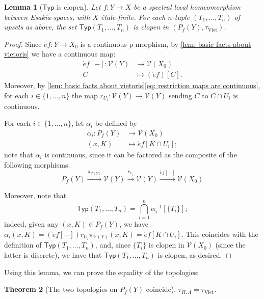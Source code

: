 \documentclass[12pt]{amsart}
\theoremstyle{plain}
\newtheorem{theorem}{Theorem}[section]
\newtheorem{lemma}[theorem]{Lemma}
\theoremstyle{definition}
\newcommand{\V}{\mathcal{V}}
\newcommand{\Viet}{\mathrm{Viet}}
\newcommand{\Typ}{\mathsf{Typ}}
\begin{document}
\begin{lemma}[$\Typ$ is clopen]\label{lem: clopenness of the type sets}
     Let $f \colon Y \to X$ be a spectral local homeomorphism between Esakia spaces, with $X$ étale-finite.
     For each $n$-tuple $(T_{1},\dots,T_{n})$ of upsets as above, the set $\Typ(T_{1},\dots,T_{n})$ is clopen in $(P_{f}(Y),\tau_{\Viet})$.
\end{lemma}
\begin{proof}    
    Since $\acute{e} f \colon Y\to X_{0}$ is a continuous p-morphism, by \cref{lem: basic facts about vietoris} we have a continuous map:
    \begin{align*}
        \acute{e}f[-]\colon  \V(Y)&\longrightarrow \V(X_{0})\\
        C &\longmapsto (\acute{e}f)[C].
    \end{align*}
    Moreover, by \cref{lem: basic facts about vietoris}\eqref{eq: restriction maps are continuous}, for each $i\in \{1,\dots,n\}$ the map $r_{U_{i}}\colon \V(Y)\to \V(Y)$ sending $C$ to $C\cap U_{i}$ is continuous.
    
    For each $i \in \{1, \dots, n\}$, let $\alpha_{i}$ be defined by
    \begin{align*}
        \alpha_{i}\colon P_{f}(Y) & \longrightarrow \V(X_{0})\\
        (x,K) &\longmapsto \acute{e}f[K\cap U_{i}];
    \end{align*}
    note that $\alpha_{i}$ is continuous, since it can be factored as the composite of the following morphisms:
    \[
    P_f(Y) \xrightarrow{\pi_{\V(Y)}} \V(Y) \xrightarrow{r_{U_i}} \V(Y) \xrightarrow{\acute{e}f[-]} \V(X_0)
    \]

    Moreover, note that
    \begin{equation*}
        \Typ(T_{1},\dots,T_{n}) = \bigcap_{i=1}^{n}\alpha_{i}^{-1}[\{T_{i}\}];
    \end{equation*}
    indeed, given any $(x,K)\in P_{f}(Y)$, we have $\alpha_{i}(x,K)=(\acute{e}f[-])r_{U_{i}}\pi_{\V(Y)}(x,K)=\acute{e}f[K\cap U_{i}]$. This coincides with the definition of $\Typ(T_{1}, \dots, T_{n})$, and, since $\{T_{i}\}$ is clopen in $\V(X_{0})$ (since the latter is discrete), we have that $\Typ(T_{1}, \dots, T_{n})$ is clopen, as desired.
\end{proof}

Using this lemma, we can prove the equality of the topologies:

\begin{theorem}[The two topologies on $P_f(Y)$ coincide]\label{thm: Identification with Vietoris}
    $\tau_{\Pi,\Lambda} = \tau_{\Viet}$.
\end{theorem}
\end{document}
